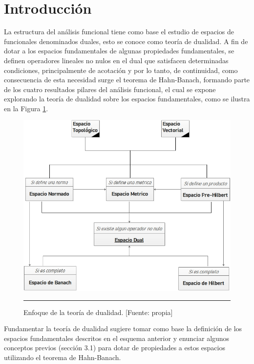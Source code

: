 \documentclass[10pt]{amsart}
\theoremstyle{remark}
\numberwithin{equation}{section}
\begin{document}

\section*{Introducción}

La estructura del análisis funcional tiene como base el estudio de espacios de funcionales denominados duales, esto se conoce como teoría de dualidad. A fin de dotar a los espacios fundamentales de algunas propiedades fundamentales, se definen operadores lineales no nulos en el dual que satisfacen determinadas condiciones, principalmente de acotación y por lo tanto, de continuidad, como consecuencia de esta necesidad surge el teorema de Hahn-Banach, formando parte de los cuatro resultados pilares del análisis funcional, el cual se expone explorando la teoría de dualidad sobre los espacios fundamentales, como se ilustra en la Figura \ref{01}.\\ 

\begin{figure}[h]
\centering
\includegraphics[scale=0.6]{Pic/ESQUEMA01}
\caption{Enfoque de la teoría de dualidad. [Fuente: propia]}
\label{01}	
\hrule
\end{figure}

Fundamentar la teoría de dualidad sugiere tomar como base la definición de los espacios fundamentales descritos en el esquema anterior y enunciar algunos conceptos previos (sección 3.1) para dotar de propiedades a estos espacios utilizando el teorema de Hahn-Banach.\\
\end{document}
